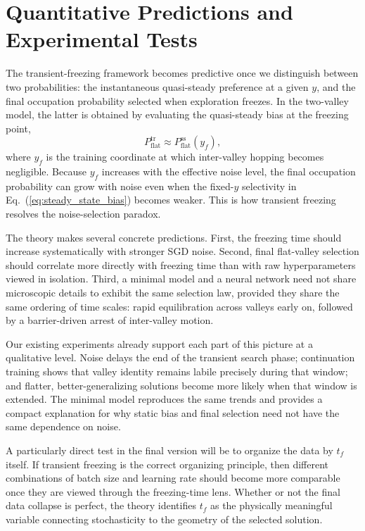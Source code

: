 \documentclass[aps,prx,reprint,superscriptaddress,longbibliography,nofootinbib,floatfix]{revtex4-2}
\begin{document}
\section{Quantitative Predictions and Experimental Tests}
The transient-freezing framework becomes predictive once we distinguish between two probabilities: the instantaneous quasi-steady preference at a given $y$, and the final occupation probability selected when exploration freezes. In the two-valley model, the latter is obtained by evaluating the quasi-steady bias at the freezing point,
\begin{equation}
P_{\mathrm{flat}}^{\mathrm{tr}} \approx P_{\mathrm{flat}}^{\mathrm{ss}}\!\left(y_f\right),
\label{eq:transient_selection}
\end{equation}
where $y_f$ is the training coordinate at which inter-valley hopping becomes negligible. Because $y_f$ increases with the effective noise level, the final occupation probability can grow with noise even when the fixed-$y$ selectivity in Eq.~(\ref{eq:steady_state_bias}) becomes weaker. This is how transient freezing resolves the noise-selection paradox.

The theory makes several concrete predictions. First, the freezing time should increase systematically with stronger SGD noise. Second, final flat-valley selection should correlate more directly with freezing time than with raw hyperparameters viewed in isolation. Third, a minimal model and a neural network need not share microscopic details to exhibit the same selection law, provided they share the same ordering of time scales: rapid equilibration across valleys early on, followed by a barrier-driven arrest of inter-valley motion.

Our existing experiments already support each part of this picture at a qualitative level. Noise delays the end of the transient search phase; continuation training shows that valley identity remains labile precisely during that window; and flatter, better-generalizing solutions become more likely when that window is extended. The minimal model reproduces the same trends and provides a compact explanation for why static bias and final selection need not have the same dependence on noise.

A particularly direct test in the final version will be to organize the data by $t_f$ itself. If transient freezing is the correct organizing principle, then different combinations of batch size and learning rate should become more comparable once they are viewed through the freezing-time lens. Whether or not the final data collapse is perfect, the theory identifies $t_f$ as the physically meaningful variable connecting stochasticity to the geometry of the selected solution.
\end{document}
